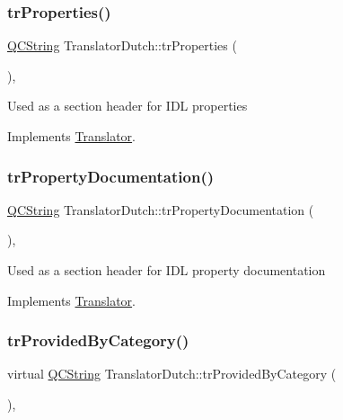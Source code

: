 \subsubsection{\texorpdfstring{trProperties()}{trProperties()}}
{\footnotesize\ttfamily \mbox{\hyperlink{class_q_c_string}{Q\+C\+String}} Translator\+Dutch\+::tr\+Properties (\begin{DoxyParamCaption}{ }\end{DoxyParamCaption})\hspace{0.3cm}{\ttfamily [inline]}, {\ttfamily [virtual]}}

Used as a section header for I\+DL properties 

Implements \mbox{\hyperlink{class_translator}{Translator}}.

\mbox{\label{class_translator_dutch_ad58c7ae26a75336f2a67eabfc3858389}} 
\subsubsection{\texorpdfstring{trPropertyDocumentation()}{trPropertyDocumentation()}}
{\footnotesize\ttfamily \mbox{\hyperlink{class_q_c_string}{Q\+C\+String}} Translator\+Dutch\+::tr\+Property\+Documentation (\begin{DoxyParamCaption}{ }\end{DoxyParamCaption})\hspace{0.3cm}{\ttfamily [inline]}, {\ttfamily [virtual]}}

Used as a section header for I\+DL property documentation 

Implements \mbox{\hyperlink{class_translator}{Translator}}.

\mbox{\label{class_translator_dutch_ae882bdbafbc3dfba727e85dc527b170e}} 
\subsubsection{\texorpdfstring{trProvidedByCategory()}{trProvidedByCategory()}}
{\footnotesize\ttfamily virtual \mbox{\hyperlink{class_q_c_string}{Q\+C\+String}} Translator\+Dutch\+::tr\+Provided\+By\+Category (\begin{DoxyParamCaption}{ }\end{DoxyParamCaption})\hspace{0.3cm}{\ttfamily [inline]}, {\ttfamily [virtual]}}

